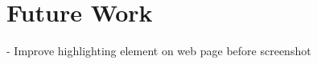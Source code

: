 \chapter{Future Work}\label{ch:futwork}

- Improve highlighting element on web page before screenshot\\

